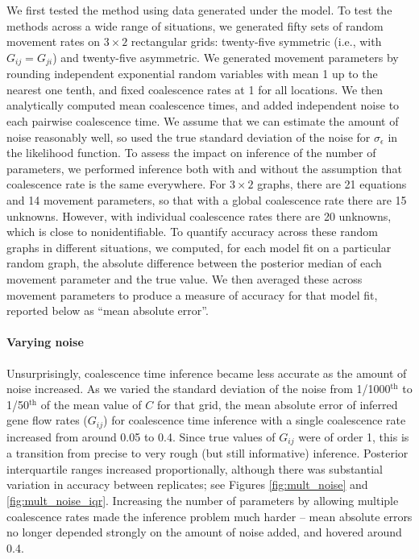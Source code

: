 \documentclass{article}
\begin{document}
We first tested the method using data generated under the model.
To test the methods across a wide range of situations,
we generated fifty sets of random movement rates on $3 \times 2$ rectangular grids:
twenty-five symmetric (i.e., with $G_{ij} = G_{ji}$) and twenty-five asymmetric.
We generated movement parameters
by rounding independent exponential random variables with mean 1 up to the nearest one tenth, 
and fixed coalescence rates at 1 for all locations.
We then analytically computed mean coalescence times,
and added independent noise to each pairwise coalescence time.
We assume that we can estimate the amount of noise reasonably well,  
so used the true standard deviation of the noise for $\sigma_\epsilon$ in the likelihood function.
To assess the impact on inference of the number of parameters,
we performed inference both with and without the assumption 
that coalescence rate is the same everywhere.
For $3 \times 2$ graphs, there are 21 equations
and 14 movement parameters,
so that with a global coalescence rate there are 15 unknowns.
However, with individual coalescence rates there are 20 unknowns,
which is close to nonidentifiable.
To quantify accuracy across these random graphs in different situations,
we computed, for each model fit on a particular random graph,
the absolute difference between the posterior median of each movement parameter
and the true value.
We then averaged these across movement parameters to produce a measure of accuracy for that model fit,
reported below as ``mean absolute error''.


\paragraph{Varying noise}
Unsurprisingly, coalescence time inference became less accurate as the amount of noise increased.
As we varied the standard deviation of the noise 
from 1/1000${}^\text{th}$ to 1/50${}^\text{th}$ of the mean value of $C$ for that grid,
the mean absolute error of inferred gene flow rates ($G_{ij}$) 
for coalescence time inference with a single coalescence rate
increased from around 0.05 to 0.4.
Since true values of $G_{ij}$ were of order 1,
this is a transition from precise to very rough (but still informative) inference.
Posterior interquartile ranges increased proportionally,
although there was substantial variation in accuracy between replicates;
see Figures \ref{fig:mult_noise} and \ref{fig:mult_noise_iqr}.
Increasing the number of parameters by allowing multiple coalescence rates
made the inference problem much harder --
mean absolute errors no longer depended strongly on the amount of noise added,
and hovered around 0.4.
\end{document}
